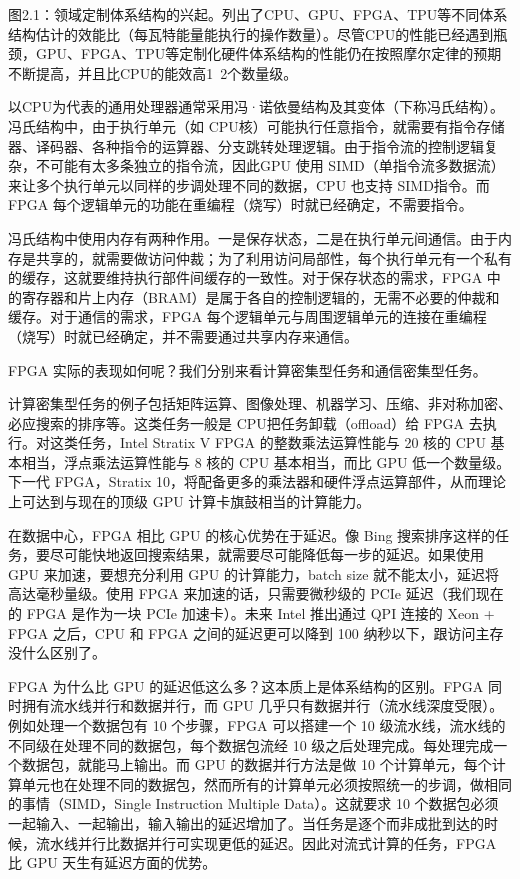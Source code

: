 图2.1：领域定制体系结构的兴起。列出了CPU、GPU、FPGA、TPU等不同体系结构估计的效能比（每瓦特能量能执行的操作数量）。尽管CPU的性能已经遇到瓶颈，GPU、FPGA、TPU等定制化硬件体系结构的性能仍在按照摩尔定律的预期不断提高，并且比CPU的能效高1~2个数量级。

以CPU为代表的通用处理器通常采用冯·诺依曼结构及其变体（下称冯氏结构）。冯氏结构中，由于执行单元（如 CPU核）可能执行任意指令，就需要有指令存储器、译码器、各种指令的运算器、分支跳转处理逻辑。由于指令流的控制逻辑复杂，不可能有太多条独立的指令流，因此GPU 使用 SIMD（单指令流多数据流）来让多个执行单元以同样的步调处理不同的数据，CPU 也支持 SIMD指令。而 FPGA 每个逻辑单元的功能在重编程（烧写）时就已经确定，不需要指令。

冯氏结构中使用内存有两种作用。一是保存状态，二是在执行单元间通信。由于内存是共享的，就需要做访问仲裁；为了利用访问局部性，每个执行单元有一个私有的缓存，这就要维持执行部件间缓存的一致性。对于保存状态的需求，FPGA 中的寄存器和片上内存（BRAM）是属于各自的控制逻辑的，无需不必要的仲裁和缓存。对于通信的需求，FPGA 每个逻辑单元与周围逻辑单元的连接在重编程（烧写）时就已经确定，并不需要通过共享内存来通信。

FPGA 实际的表现如何呢？我们分别来看计算密集型任务和通信密集型任务。

计算密集型任务的例子包括矩阵运算、图像处理、机器学习、压缩、非对称加密、必应搜索的排序等。这类任务一般是 CPU把任务卸载（offload）给 FPGA 去执行。对这类任务，Intel Stratix V FPGA 的整数乘法运算性能与 20 核的 CPU 基本相当，浮点乘法运算性能与 8 核的 CPU 基本相当，而比 GPU 低一个数量级。下一代 FPGA，Stratix 10，将配备更多的乘法器和硬件浮点运算部件，从而理论上可达到与现在的顶级 GPU 计算卡旗鼓相当的计算能力。

在数据中心，FPGA 相比 GPU 的核心优势在于延迟。像 Bing 搜索排序这样的任务，要尽可能快地返回搜索结果，就需要尽可能降低每一步的延迟。如果使用 GPU 来加速，要想充分利用 GPU 的计算能力，batch size 就不能太小，延迟将高达毫秒量级。使用 FPGA 来加速的话，只需要微秒级的 PCIe 延迟（我们现在的 FPGA 是作为一块 PCIe 加速卡）。未来 Intel 推出通过 QPI 连接的 Xeon + FPGA 之后，CPU 和 FPGA 之间的延迟更可以降到 100 纳秒以下，跟访问主存没什么区别了。

FPGA 为什么比 GPU 的延迟低这么多？这本质上是体系结构的区别。FPGA 同时拥有流水线并行和数据并行，而 GPU 几乎只有数据并行（流水线深度受限）。例如处理一个数据包有 10 个步骤，FPGA 可以搭建一个 10 级流水线，流水线的不同级在处理不同的数据包，每个数据包流经 10 级之后处理完成。每处理完成一个数据包，就能马上输出。而 GPU 的数据并行方法是做 10 个计算单元，每个计算单元也在处理不同的数据包，然而所有的计算单元必须按照统一的步调，做相同的事情（SIMD，Single Instruction Multiple Data）。这就要求 10 个数据包必须一起输入、一起输出，输入输出的延迟增加了。当任务是逐个而非成批到达的时候，流水线并行比数据并行可实现更低的延迟。因此对流式计算的任务，FPGA 比 GPU 天生有延迟方面的优势。


